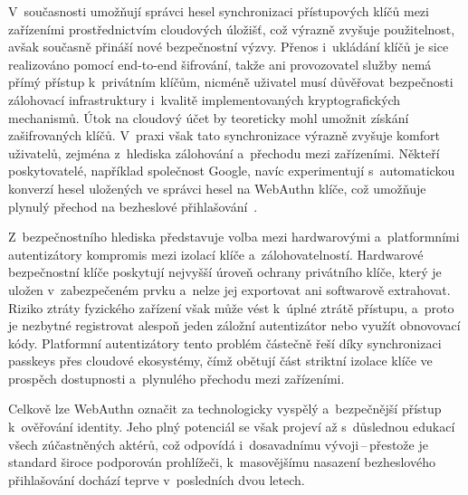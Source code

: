 V~současnosti umožňují správci hesel synchronizaci přístupových klíčů mezi zařízeními prostřednictvím cloudových úložišť, což výrazně zvyšuje použitelnost, avšak současně přináší nové bezpečnostní výzvy.
Přenos i~ukládání klíčů je sice realizováno pomocí end-to-end šifrování, takže ani provozovatel služby nemá přímý přístup k~privátním klíčům, nicméně uživatel musí důvěřovat bezpečnosti zálohovací infrastruktury i~kvalitě implementovaných kryptografických mechanismů.
Útok na cloudový účet by teoreticky mohl umožnit získání zašifrovaných klíčů.
V~praxi však tato synchronizace výrazně zvyšuje komfort uživatelů, zejména z~hlediska zálohování a~přechodu mezi zařízeními.
Někteří poskytovatelé, například společnost Google, navíc experimentují s~automatickou konverzí hesel uložených ve správci hesel na WebAuthn klíče, což umožňuje plynulý přechod na bezheslové přihlašování~\cite{www-google-passkeys-creation}.

Z~bezpečnostního hlediska představuje volba mezi hardwarovými a~platformními autentizátory kompromis mezi izolací klíče a~zálohovatelností.
Hardwarové bezpečnostní klíče poskytují nejvyšší úroveň ochrany privátního klíče, který je uložen v~zabezpečeném prvku a~nelze jej exportovat ani softwarově extrahovat.
Riziko ztráty fyzického zařízení však může vést k~úplné ztrátě přístupu, a~proto je nezbytné registrovat alespoň jeden záložní autentizátor nebo využít obnovovací kódy.
Platformní autentizátory tento problém částečně řeší díky synchronizaci passkeys přes cloudové ekosystémy, čímž obětují část striktní izolace klíče ve prospěch dostupnosti a~plynulého přechodu mezi zařízeními.

Celkově lze WebAuthn označit za technologicky vyspělý a~bezpečnější přístup k~ověřování identity.
Jeho plný potenciál se však projeví až s~důslednou edukací všech zúčastněných aktérů, což odpovídá i~dosavadnímu vývoji\,--\,přestože je standard široce podporován prohlížeči, k~masovějšímu nasazení bezheslového přihlašování dochází teprve v~posledních dvou letech.

